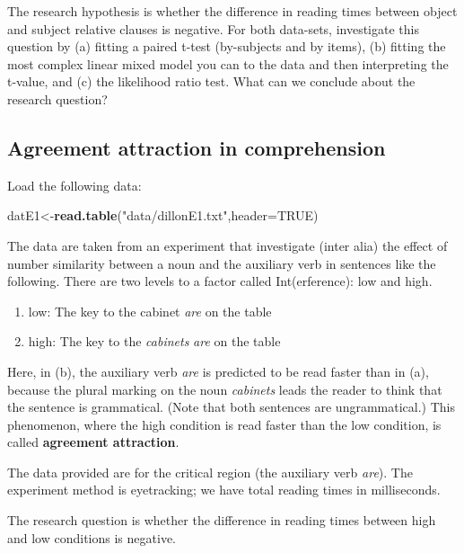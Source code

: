 \documentclass[12pt,]{krantz}
\newenvironment{Shaded}{\begin{snugshade}}{\end{snugshade}}
\newcommand{\DataTypeTok}[1]{\textcolor[rgb]{0.13,0.29,0.53}{#1}}
\newcommand{\KeywordTok}[1]{\textcolor[rgb]{0.13,0.29,0.53}{\textbf{#1}}}
\newcommand{\NormalTok}[1]{#1}
\newcommand{\OtherTok}[1]{\textcolor[rgb]{0.56,0.35,0.01}{#1}}
\newcommand{\StringTok}[1]{\textcolor[rgb]{0.31,0.60,0.02}{#1}}
\providecommand{\tightlist}{%
  \setlength{\itemsep}{0pt}\setlength{\parskip}{0pt}}
\begin{document}
The research hypothesis is whether the difference in reading times between object and subject relative clauses is negative. For both data-sets, investigate this question by (a) fitting a paired t-test (by-subjects and by items), (b) fitting the most complex linear mixed model you can to the data and then interpreting the t-value, and (c) the likelihood ratio test. What can we conclude about the research question?

\hypertarget{sec:HypTestExerciseAgrmt}{%
\subsection{Agreement attraction in comprehension}\label{sec:HypTestExerciseAgrmt}}

Load the following data:

\begin{Shaded}
\begin{Highlighting}[]
\NormalTok{datE1<-}\KeywordTok{read.table}\NormalTok{(}\StringTok{"data/dillonE1.txt"}\NormalTok{,}\DataTypeTok{header=}\OtherTok{TRUE}\NormalTok{)}
\end{Highlighting}
\end{Shaded}

The data are taken from an experiment that investigate (inter alia) the effect of number similarity between a noun and the auxiliary verb in sentences like the following. There are two levels to a factor called Int(erference): low and high.

\begin{enumerate}
\def\labelenumi{(\alph{enumi})}
\tightlist
\item
  low: The key to the cabinet \emph{are} on the table
\item
  high: The key to the \emph{cabinets} \emph{are} on the table
\end{enumerate}

Here, in (b), the auxiliary verb \emph{are} is predicted to be read faster than in (a), because the plural marking on the noun \emph{cabinets} leads the reader to think that the sentence is grammatical. (Note that both sentences are ungrammatical.) This phenomenon, where the high condition is read faster than the low condition, is called \textbf{agreement attraction}.

The data provided are for the critical region (the auxiliary verb \emph{are}). The experiment method is eyetracking; we have total reading times in milliseconds.

The research question is whether the difference in reading times between high and low conditions is negative.
\end{document}
